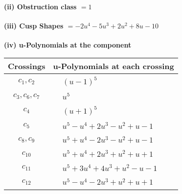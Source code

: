 \documentclass[1p]{elsarticle_modified}
\theoremstyle{definition}
\begin{document}
\flushleft \textbf{(ii) Obstruction class $= 1$}\\~\\
\flushleft \textbf{(iii) Cusp Shapes $= -2 u^4-5 u^3+2 u^2+8 u-10$}\\~\\
\newpage\renewcommand{\arraystretch}{1}
\flushleft \textbf{(iv) u-Polynomials at the component}\newline \\
\begin{tabular}{m{50pt}|m{274pt}}
Crossings & \hspace{64pt}u-Polynomials at each crossing \\
\hline $$\begin{aligned}c_{1},c_{2}\end{aligned}$$&$\begin{aligned}
&(u-1)^5
\end{aligned}$\\
\hline $$\begin{aligned}c_{3},c_{6},c_{7}\end{aligned}$$&$\begin{aligned}
&u^5
\end{aligned}$\\
\hline $$\begin{aligned}c_{4}\end{aligned}$$&$\begin{aligned}
&(u+1)^5
\end{aligned}$\\
\hline $$\begin{aligned}c_{5}\end{aligned}$$&$\begin{aligned}
&u^5- u^4+2 u^3- u^2+u-1
\end{aligned}$\\
\hline $$\begin{aligned}c_{8},c_{9}\end{aligned}$$&$\begin{aligned}
&u^5+u^4-2 u^3- u^2+u-1
\end{aligned}$\\
\hline $$\begin{aligned}c_{10}\end{aligned}$$&$\begin{aligned}
&u^5+u^4+2 u^3+u^2+u+1
\end{aligned}$\\
\hline $$\begin{aligned}c_{11}\end{aligned}$$&$\begin{aligned}
&u^5+3 u^4+4 u^3+u^2- u-1
\end{aligned}$\\
\hline $$\begin{aligned}c_{12}\end{aligned}$$&$\begin{aligned}
&u^5- u^4-2 u^3+u^2+u+1
\end{aligned}$\\
\hline
\end{tabular}\\~\\
\end{document}
